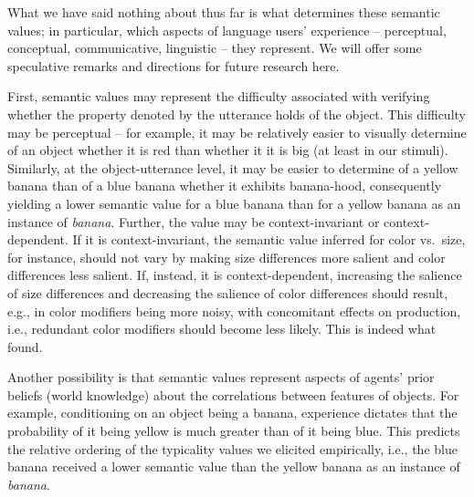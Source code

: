 \documentclass[11pt]{article}
\begin{document}
What we have said nothing about thus far is what determines these semantic values; in particular, which aspects of language users' experience -- perceptual, conceptual, communicative, linguistic -- they represent. We will offer some speculative remarks and directions for future research here. 

First, semantic values may  represent the difficulty associated with verifying whether the property denoted by the utterance holds of the object. This difficulty may be perceptual -- for example, it may be relatively easier to visually determine of an object whether it is red than whether it it is big (at least in our stimuli). Similarly, at the object-utterance level, it may be easier to determine of a yellow banana than of a blue banana whether it exhibits banana-hood,  consequently yielding a lower semantic value for a blue banana than for a yellow banana as an instance of \emph{banana}. Further, the value may be context-invariant or context-dependent. If it is context-invariant, the semantic value inferred for color vs.~size, for instance, should not vary by making size differences more salient and color differences less salient. If, instead, it is context-dependent, increasing the salience of size differences and decreasing the salience of color differences should result, e.g.,  in  color modifiers being more noisy, with concomitant effects on production, i.e., redundant color modifiers should become less likely. This is indeed what  found.

Another possibility is that semantic values represent aspects of agents' prior beliefs (world knowledge) about the correlations between features of objects. For example, conditioning on an object being a banana, experience dictates that the probability of it being yellow is much greater than of it being blue. This predicts the relative ordering of the typicality values we elicited empirically, i.e., the blue banana received a lower semantic value than the yellow banana as an instance of \emph{banana}.  
\end{document}
